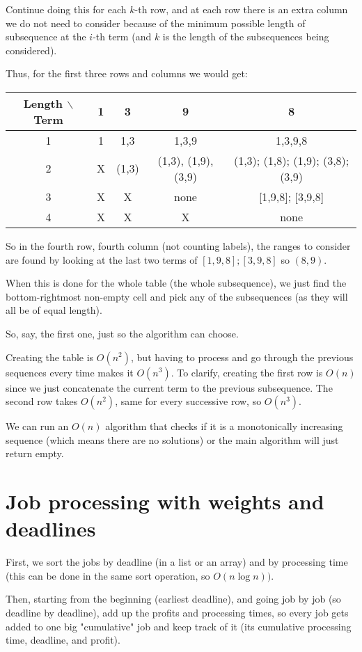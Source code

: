 \documentclass[11pt,letterpaper]{article}
\begin{document}
		Continue doing this for each $k$-th row, and at each row there is an extra column we do not need to consider because of the minimum possible length of subsequence at the $i$-th term (and $k$ is the length of the subsequences being considered).
		
		Thus, for the first three rows and columns we would get:
		
		\begin{tabular}{|c|c|c|c|c|}
			Length $\backslash$ Term & 1 & 3 & 9 & 8 \\ 
			\hline 
			1 & 1 & 1,3 & 1,3,9 & 1,3,9,8 \\ 
			\hline 
			2 & X & (1,3) & (1,3), (1,9), (3,9) & (1,3); (1,8); (1,9); (3,8); (3,9) \\ 
			\hline 
			3 & X & X & none & [1,9,8]; [3,9,8] \\ 
			\hline 
			4 & X & X & X & none \\ 
		\end{tabular}
		
		So in the fourth row, fourth column (not counting labels), the ranges to consider are found by looking at the last two terms of $[1,9,8]; [3,9,8]$ so $(8,9)$.
		
		When this is done for the whole table (the whole subsequence), we just find the bottom-rightmost non-empty cell and pick any of the subsequences (as they will all be of equal length).
		
		So, say, the first one, just so the algorithm can choose.
		
		Creating the table is $O(n^2)$, but having to process and go through the previous sequences every time makes it $O(n^3)$.
		To clarify, creating the first row is $O(n)$ since we just concatenate the current term to the previous subsequence.
		The second row takes $O(n^2)$, same for every successive row, so $O(n^3)$.
		
		We can run an $O(n)$ algorithm that checks if it is a monotonically increasing sequence (which means there are no solutions) or the main algorithm will just return empty.
	
	\section{Job processing with weights and deadlines}
		First, we sort the jobs by deadline (in a list or an array) and by processing time (this can be done in the same sort operation, so $O(n\log n))$.
		
		Then, starting from the beginning (earliest deadline), and going job by job (so deadline by deadline), add up the profits and processing times, so every job gets added to one big "cumulative" job and keep track of it (its cumulative processing time, deadline, and profit).
		
\end{document}
